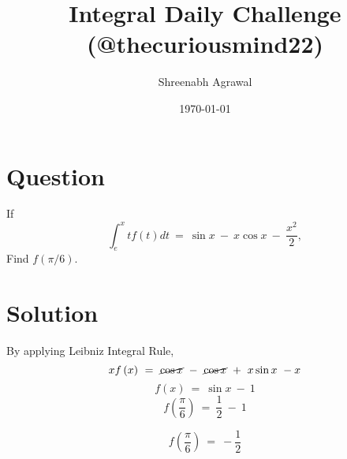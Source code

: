 \documentclass{article}
\title{Integral Daily Challenge (@thecuriousmind22)}
\author{Shreenabh Agrawal }
\date{\today}
\begin{document}
\maketitle

\section{Question}
If $$\int_{e}^{x}tf\left(t\right)dt\ =\ \sin x\ -\ x\cos x\ -\ \frac{x^{2}}{2},$$
Find $f(\pi/6).$
\section{Solution}
By applying Leibniz Integral Rule,
$$xf\left(x\right)\ =\ \cancel{\cos x}\ -\ \cancel{\cos x}\ +\ x\sin x\ -x$$
$$f\left(x\right)\ =\ \sin x\ -\ 1$$
$$f\left(\frac{\pi}{6}\right)\ =\ \frac{1}{2}\ -\ 1$$

$$\boxed{f\left(\frac{\pi}{6}\right)\ =\ -\frac{1}{2}}$$
\end{document}

